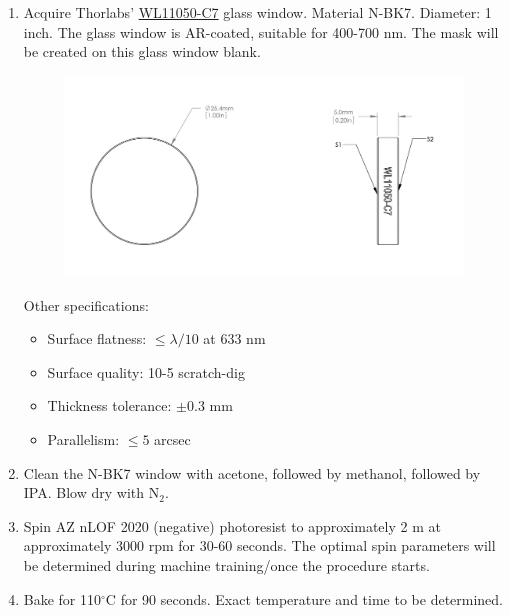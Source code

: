 \documentclass{article}
\theoremstyle{definition}
\begin{document}
\begin{enumerate}[label=(\alph*)]

\item Acquire Thorlabs' \href{https://www.thorlabs.com/thorproduct.cfm?partnumber=WL11050-C7}{WL11050-C7} glass window. Material N-BK7. Diameter: 1 inch. The glass window is AR-coated, suitable for 400-700 nm. The mask will be created on this glass window blank. 



\begin{figure}[!htb]
\centering
\includegraphics[scale=0.6]{thorlabs_window.png}
\end{figure}

Other specifications:
\begin{itemize}
\item Surface flatness: $\leq \lambda/10$ at 633 nm

\item Surface quality: 10-5 scratch-dig

\item Thickness tolerance: $\pm 0.3$ mm 

\item Parallelism: $\leq 5$ arcsec
\end{itemize}


\item Clean the N-BK7 window with acetone, followed by methanol, followed by IPA. Blow dry with N$_2$.

\item Spin AZ nLOF 2020 (negative) photoresist to approximately 2 \textmu m at approximately 3000 rpm for 30-60 seconds. The optimal spin parameters will be determined during machine training/once the procedure starts.

\item Bake for 110$^\circ$C for 90 seconds. Exact temperature and time to be determined. 


\end{enumerate}
\end{document}
